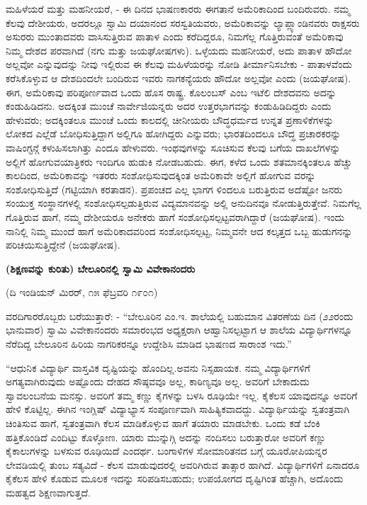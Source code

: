 ಮಹಿಳೆಯರೆ ಮತ್ತು ಮಹನೀಯರೆ, - ಈ ದಿನದ ಭಾಷಣಕಾರರು ಈಗತಾನೆ ಅಮೆರಿಕಾದಿಂದ ಬಂದಿರುವರು. ನಮ್ಮ ಕೆಲವು ದೇಶೀಯರು, ಅದರಲ್ಲೂ ಸ್ವಾಮಿ ದಯಾನಂದ ಸರಸ್ವತಿಯವರು, ಅಮೆರಿಕಾವನ್ನು ಲ್ಯಾಪ್ಲ್ಯಾಂಡಿನವರು ರಾಕ್ಷಸರು ಅಸುರರು ಮುಂತಾದವರು ವಾಸಿಸುತ್ತಿರುವ ಪಾತಾಳ ಎಂದು ಕರೆದಿದ್ದರೂ, ನಿಮಗೆಲ್ಲ ಗೊತ್ತಿರುವಂತೆ ಅಮೆರಿಕಾವು ನಿಮ್ಮ ದೇಶದ ಪರವಾಗಿದೆ (ನಗು ಮತ್ತು ಜಯಘೋಷಗಳು). ಒಳ್ಳೆಯದು ಮಹನೀಯರೆ, ಅದು ಪಾತಾಳ ಹೌದೋ ಅಲ್ಲವೋ ಎನ್ನುವುದನ್ನು ನೀವು ಇಲ್ಲಿರುವ ಈ ಕೆಲವು ಮಹಿಳೆಯರನ್ನು ನೋಡಿ ತೀರ್ಮಾನಿಸಬೇಕು - ಪಾತಾಳವೆಂದು ಕರೆಸಿಕೊಳ್ಳುವ ಆ ದೇಶದಿಂದಲೇ ಬಂದಿರುವ ಇವರು ನಾಗಕನ್ಯೆಯರು ಹೌದೋ ಅಲ್ಲವೋ ಎಂದು (ಜಯಘೋಷ). ಈಗ, ಅಮೆರಿಕಾವು ಪರಿಪೂರ್ಣವಾದ ಒಂದು ಹೊಸ ರಾಷ್ಟ್ರ. ಕೊಲಂಬಸ್ ಎಂಬ ಇಟೆಲಿ ದೇಶದವನು ಅದನ್ನು ಕಂಡುಹಿಡಿದನು. ಅದಕ್ಕಿಂತ ಮುಂಚೆ ನಾರ್ವೇಜಿಯನ್ನರು ಅದರ ಉತ್ತರಭಾಗವನ್ನು ಕಂಡುಹಿಡಿದಿದ್ದರು ಎಂದು ಹೇಳುವರು; ಅದಕ್ಕಿಂತಲೂ ಮುಂಚೆ ಒಂದು ಕಾಲದಲ್ಲಿ ಚೀನೀಯರು ಬೌದ್ಧಧರ್ಮದ ಉನ್ನತ ಪ್ರಣಾಳಿಕೆಗಳನ್ನು ಲೋಕದ ಎಲ್ಲೆಡೆ ಬೋಧಿಸುತ್ತಿದ್ದಾಗ ಅಲ್ಲಿಗೂ ಹೋಗಿದ್ದರು ಎನ್ನುವರು; ಭಾರತದಿಂದಲೂ ಬೌದ್ಧ ಪ್ರಚಾರಕರನ್ನು ವಾಷಿಂಗ್ಟನ್ಗೆ ಕಳುಹಿಸಲಾಗಿತ್ತು ಎಂದೂ ಹೇಳುವರು. ಇಂಥವುಗಳನ್ನು ಸೂಚಿಸುವ ಕೆಲವು ಬಗೆಯ ದಾಖಲೆಗಳನ್ನು ಅಲ್ಲಿಗೆ ಹೋಗುವಯಾತ್ರಿಕರು ಇಂದಿಗೂ ಹುಡುಕಿ ನೋಡಬಹುದು. ಈಗ, ಕಳೆದ ಒಂದು ಶತಮಾನಕ್ಕಿಂತಲೂ ಹೆಚ್ಚು ಕಾಲದಿಂದ, ಅಮೆರಿಕಾವನ್ನು ಇತರರು ಸಂಶೋಧಿಸುವುದಕ್ಕಿಂತ ಅಮೆರಿಕಾವೇ ಅಲ್ಲಿಗೆ ಹೋಗುವ ವರನ್ನು ಸಂಶೋಧಿಸುತ್ತಿದೆ (ಗಟ್ಟಿಯಾಗಿ ಕರತಾಡನ). ಪ್ರಪಂಚದ ಎಲ್ಲ ಭಾಗಗ ಳಿಂದಲೂ ಬರುತ್ತಿರುವ ಅದೆಷ್ಟೋ ಜನರು ಸಂಯುಕ್ತ ಸಂಸ್ಥಾನಗಳಲ್ಲಿ ಸಂಶೋಧಿಸಲ್ಪಡುತ್ತಿರುವ ವಿದ್ಯಮಾನವನ್ನು ಅಲ್ಲಿ ಅನುದಿನವೂ ನೋಡುತ್ತಿರುತ್ತೇವೆ. ನಿಮಗೆಲ್ಲ ಗೊತ್ತಿರುವ ಹಾಗೆ, ನಮ್ಮ ದೇಶೀಯರೂ ಅನೇಕರು ಹಾಗೆ ಸಂಶೋಧಿಸಲ್ಪಟ್ಟವರಾಗಿದ್ದಾರೆ (ಜಯಘೋಷ). ಇಂದು ನಾನಿಲ್ಲಿ ನಿಮ್ಮ ಮುಂದೆ ಹಾಗೆ ಅಮೆರಿಕಾದವರಿಂದ ಸಂಶೋಧಿಸಲ್ಪಟ್ಟ, ನಿಮ್ಮವನೇ ಆದ ಕಲ್ಕತ್ತದ ಒಬ್ಬ ಹುಡುಗನನ್ನು ಪರಿಚಯಿಸುತ್ತಿದ್ದೇನೆ (ಜಯಘೋಷ).

\begin{center}
\textbf{(ಶಿಕ್ಷಣವನ್ನು ಕುರಿತು) ಬೇಲೂರಿನಲ್ಲಿ ಸ್ವಾಮಿ ವಿವೇಕಾನಂದರು}
\end{center}

\begin{center}
(ದಿ ಇಂಡಿಯನ್ ಮಿರರ್, ೧೫ ಫೆಬ್ರವರಿ ೧೯೦೧)
\end{center}

ವರದಿಗಾರರೊಬ್ಬರು ಬರೆಯುತ್ತಾರೆ: - “ಬೇಲೂರಿನ ಎಂ.ಇ. ಶಾಲೆಯಲ್ಲಿ ಬಹುಮಾನ ವಿತರಣೆಯ ದಿನ (೨೨ರಂದು ಭಾನುವಾರ) ಸ್ವಾಮಿ ವಿವೇಕಾನಂದರು ಸಮಾರಂಭದ ಅಧ್ಯಕ್ಷರಾಗಿ ಆಹ್ವಾನಿಸಲ್ಪಟ್ಟಾಗ ಆ ಶಾಲೆಯ ವಿದ್ಯಾರ್ಥಿಗಳನ್ನೂ ನೆರೆದಿದ್ದ ಬೇಲೂರಿನ ಹಿರಿಯ ನಾಗರಿಕರನ್ನೂ ಉದ್ದೇಶಿಸಿ ಮಾಡಿದ ಭಾಷಣದ ಸಾರಾಂಶ ಇದು.”

“ಆಧುನಿಕ ವಿದ್ಯಾರ್ಥಿ ವಾಸ್ತವಿಕ ದೃಷ್ಟಿಯನ್ನು ಹೊಂದಿಲ್ಲ.ಅವನು ನಿಸ್ಸಹಾಯಕ. ನಮ್ಮ ವಿದ್ಯಾರ್ಥಿಗಳಿಗೆ ಅಗತ್ಯವಾಗಿರುವುದು ಅಷ್ಟೊಂದು ದೇಹದ ಸೌಷ್ಠವವೂ ಅಲ್ಲ, ಕಾಠಿಣ್ಯವೂ ಅಲ್ಲ. ಅವರಿಗೆ ಬೇಕಾದುದು ಸ್ವಾವಲಂಬನೆಯ ಮನಸ್ಸು. ಅವರಿಗೆ ತಮ್ಮ ಕಣ್ಣು ಕೈಗಳನ್ನು ಬಳಸಿ ರೂಢಿಯೇ ಇಲ್ಲ. ಕೈಕೆಲಸ ಯಾವುದನ್ನೂ ಅವರಿಗೆ ಹೇಳಿ ಕೊಟ್ಟಿಲ್ಲ. ಈಗಿನ ಇಂಗ್ಲಿಷ್ ವಿದ್ಯಾಭ್ಯಾಸ ಸಂಪೂರ್ಣವಾಗಿ ಸಾಹಿತ್ಯಿಕವಾದದ್ದು. ವಿದ್ಯಾರ್ಥಿಯನ್ನು ಸ್ವತಂತ್ರವಾಗಿ ಚಿಂತಿಸುವ ಹಾಗೆ, ಸ್ವತಂತ್ರವಾಗಿ ಕೆಲಸ ಮಾಡಿಕೊಳ್ಳುವ ಹಾಗೆ ತಯಾರು ಮಾಡಬೇಕು. ಒಂದು ಕಡೆ ಬೆಂಕಿ ಹತ್ತಿಕೊಂಡಿದೆ ಎಂದಿಟ್ಟು ಕೊಳ್ಳೋಣ. ಯಾರು ಮುನ್ನುಗ್ಗಿ ಅದನ್ನು ನಂದಿಸಲು ಬರುತ್ತಾರೋ ಅವರಿಗೆ ಕಣ್ಣು ಕೈಕಾಲುಗಳನ್ನು ಬಳಸುವ ರೂಢಿಯಿದೆ ಎಂದರ್ಥ. ಬಂಗಾಳಿಗಳ ಸೋಮಾರಿತನದ ಬಗ್ಗೆ ಯೂರೋಪಿಯನ್ನರ ಲೇವಡಿಯಲ್ಲಿ ತುಂಬ ಸತ್ಯವಿದೆ - ಕೆಲಸ ಮಾಡುವುದರಲ್ಲಿ ಅವರಿಗಿರುವ ತಾತ್ಸಾರ ಹಾಗಿದೆ. ವಿದ್ಯಾರ್ಥಿಗಳಿಗೆ ಏನಾದರೂ ಕೈಕೆಲಸ ಹೇಳಿ ಕೊಡುವ ಮೂಲಕ ಇದನ್ನು ಸರಿಪಡಿಸಬಹುದು; ಉಪಯೋಗದ ದೃಷ್ಟಿಗಿಂತ ಹೆಚ್ಚಾಗಿ, ಅದೊಂದು ಮಹತ್ವದ ಶಿಕ್ಷಣವಾಗುತ್ತದೆ.

